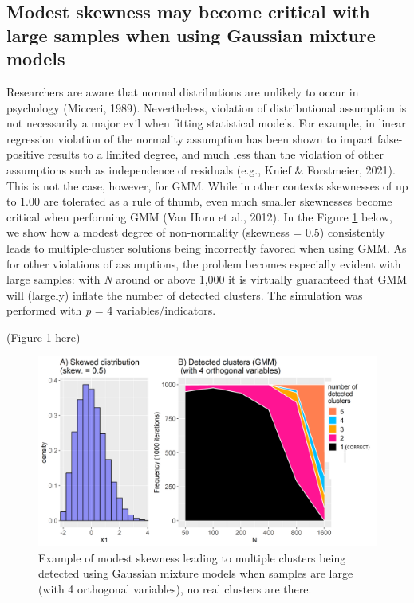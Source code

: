 \documentclass[
  man,floatsintext]{apa7}
\begin{document}
\hypertarget{modest-skewness-may-become-critical-with-large-samples-when-using-gaussian-mixture-models}{%
\subsection{Modest skewness may become critical with large samples when using Gaussian mixture models}\label{modest-skewness-may-become-critical-with-large-samples-when-using-gaussian-mixture-models}}

Researchers are aware that normal distributions are unlikely to occur in psychology (Micceri, 1989). Nevertheless, violation of distributional assumption is not necessarily a major evil when fitting statistical models. For example, in linear regression violation of the normality assumption has been shown to impact false-positive results to a limited degree, and much less than the violation of other assumptions such as independence of residuals (e.g., Knief \& Forstmeier, 2021). This is not the case, however, for GMM. While in other contexts skewnesses of up to 1.00 are tolerated as a rule of thumb, even much smaller skewnesses become critical when performing GMM (Van Horn et al., 2012). In the Figure \ref{fig:figure-modest-skewness} below, we show how a modest degree of non-normality (skewness = 0.5) consistently leads to multiple-cluster solutions being incorrectly favored when using GMM. As for other violations of assumptions, the problem becomes especially evident with large samples: with \emph{N} around or above 1,000 it is virtually guaranteed that GMM will (largely) inflate the number of detected clusters. The simulation was performed with \emph{p} = 4 variables/indicators.

(Figure \ref{fig:figure-modest-skewness} here)

\begin{figure}

{\centering \includegraphics[width=1\linewidth]{figures_external/Figure_modest_skewness} 

}

\caption{Example of modest skewness leading to multiple clusters being detected using Gaussian mixture models when samples are large (with 4 orthogonal variables), no real clusters are there.}\label{fig:figure-modest-skewness}
\end{figure}
\end{document}
